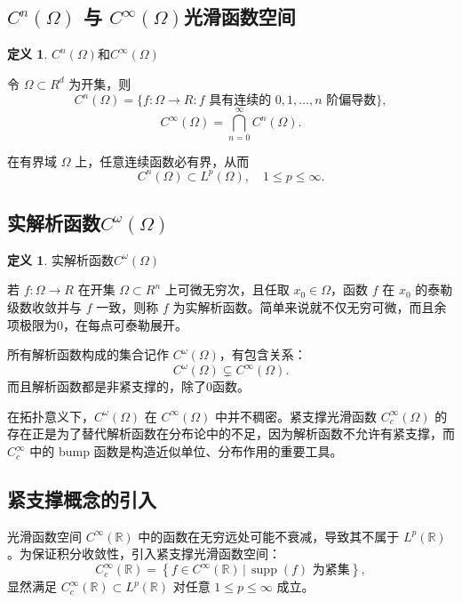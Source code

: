 \documentclass[12pt,a4paper]{article}
\newcommand{\R}{\mathbb{R}}                %
\DeclareMathOperator{\supp}{supp}          %
\def\R{R}%
\theoremstyle{plain}
\theoremstyle{definition}
\newtheorem{definition}[theorem]{定义}
\theoremstyle{remark}
\begin{document}
	

	
	\subsection{\texorpdfstring{$C^n(\Omega)$}{Cn} 与 \texorpdfstring{$C^\infty(\Omega)$}{C∞}光滑函数空间}
	
	\begin{definition}$C^n(\Omega)$和$C^\infty(\Omega)$
		
		令 $\Omega\subset\R^d$ 为开集，则
		\[
		C^n(\Omega)
		=\{f:\Omega\to\R:\text{$f$ 具有连续的 $0,1,\dots,n$ 阶偏导数}\},
		\]
		\[
		C^\infty(\Omega)
		=\bigcap_{n=0}^\infty C^n(\Omega).
		\]
	\end{definition}
	
	在有界域 $\Omega$ 上，任意连续函数必有界，从而
	\[
	C^n(\Omega)\subset L^p(\Omega),\quad 1\le p\le\infty.
	\]
	
	\subsection{实解析函数$C^\omega(\Omega)$}
	
	\begin{definition}实解析函数$C^\omega(\Omega)$
		
		若 $f:\Omega\to\R$ 在开集 $\Omega\subset\R^n$ 上可微无穷次，且任取 $x_0\in\Omega$，函数 $f$ 在 $x_0$ 的泰勒级数收敛并与 $f$ 一致，则称 $f$ 为实解析函数。简单来说就不仅无穷可微，而且余项极限为0，在每点可泰勒展开。
	\end{definition}
	
	所有解析函数构成的集合记作 $C^\omega(\Omega)$，有包含关系：
	\[
	C^\omega(\Omega)\subsetneq C^\infty(\Omega).
	\]
	而且解析函数都是非紧支撑的，除了0函数。

	
	在拓扑意义下，$C^\omega(\Omega)$ 在 $C^\infty(\Omega)$ 中并不稠密。紧支撑光滑函数 $C_c^\infty(\Omega)$ 的存在正是为了替代解析函数在分布论中的不足，因为解析函数不允许有紧支撑，而 $C_c^\infty$ 中的 bump 函数是构造近似单位、分布作用的重要工具。
	
	\subsection{紧支撑概念的引入}
	光滑函数空间 $C^\infty(\mathbb{R})$ 中的函数在无穷远处可能不衰减，导致其不属于 $L^p(\mathbb{R})$。为保证积分收敛性，引入紧支撑光滑函数空间：
	\[
	C_c^\infty(\mathbb{R}) = \left\{ f \in C^\infty(\mathbb{R}) \,\big|\, \supp(f) \text{ 为紧集} \right\},
	\]
	显然满足 $C_c^\infty(\mathbb{R}) \subset L^p(\mathbb{R})$ 对任意 $1 \leq p \leq \infty$ 成立。
\end{document}
